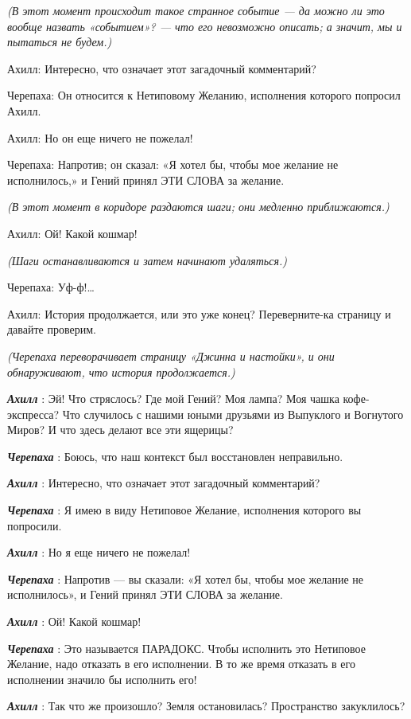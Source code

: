 \emph{(В этот момент происходит такое странное событие --- да можно ли это вообще назвать «событием»? --- что его невозможно описать; а значит, мы и пытаться не будем.)}

Ахилл: Интересно, что означает этот загадочный комментарий?

Черепаха: Он относится к Нетиповому Желанию, исполнения которого попросил Ахилл.

Ахилл: Но он еще ничего не пожелал!

Черепаха: Напротив; он сказал: «Я хотел бы, чтобы мое желание не исполнилось,» и Гений принял ЭТИ СЛОВА за желание.

\emph{(В этот момент в коридоре раздаются шаги; они медленно приближаются.)}

Ахилл: Ой! Какой кошмар!

\emph{(Шаги останавливаются и затем начинают удаляться.)}

Черепаха: Уф-ф!\ldots{}

Ахилл: История продолжается, или это уже конец? Переверните-ка страницу и давайте проверим.

\emph{(Черепаха переворачивает страницу «Джинна и настойки», и они обнаруживают, что история продолжается.)}

\emph{\textbf{Ахилл}} : Эй! Что стряслось? Где мой Гений? Моя лампа? Моя чашка кофе-экспресса? Что случилось с нашими юными друзьями из Выпуклого и Вогнутого Миров? И что здесь делают все эти ящерицы?

\emph{\textbf{Черепаха}} : Боюсь, что наш контекст был восстановлен неправильно.

\emph{\textbf{Ахилл}} : Интересно, что означает этот загадочный комментарий?

\emph{\textbf{Черепаха}} : Я имею в виду Нетиповое Желание, исполнения которого вы попросили.

\emph{\textbf{Ахилл}} : Но я еще ничего не пожелал!

\emph{\textbf{Черепаха}} : Напротив --- вы сказали: «Я хотел бы, чтобы мое желание не исполнилось», и Гений принял ЭТИ СЛОВА за желание.

\emph{\textbf{Ахилл}} : Ой! Какой кошмар!

\emph{\textbf{Черепаха}} : Это называется ПАРАДОКС. Чтобы исполнить это Нетиповое Желание, надо отказать в его исполнении. В то же время отказать в его исполнении значило бы исполнить его!

\emph{\textbf{Ахилл}} : Так что же произошло? Земля остановилась? Пространство закуклилось?


